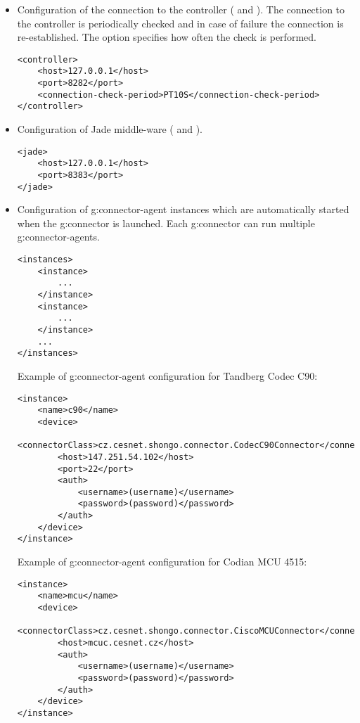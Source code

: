 \begin{itemize}
\item Configuration of the connection to the controller ( and ). The connection to the controller is periodically checked and in case of failure the connection is re-established. The option  specifies how often the check is performed.
\begin{verbatim}
<controller>
    <host>127.0.0.1</host>
    <port>8282</port>
    <connection-check-period>PT10S</connection-check-period>
</controller>
\end{verbatim}

\item Configuration of Jade middle-ware ( and ).
\begin{verbatim}
<jade>
    <host>127.0.0.1</host>
    <port>8383</port>
</jade>
\end{verbatim}

\item Configuration of \gls{g:connector-agent} instances which are automatically started when the \gls{g:connector} is launched. Each \gls{g:connector} can run multiple \glspl{g:connector-agent}.
\begin{verbatim}
<instances>
    <instance>
        ...
    </instance>
    <instance>
        ...
    </instance>
    ...
</instances>
\end{verbatim}

Example of \gls{g:connector-agent} configuration for Tandberg Codec C90:
\small\begin{verbatim}
<instance>
    <name>c90</name>
    <device>
        <connectorClass>cz.cesnet.shongo.connector.CodecC90Connector</connectorClass>
        <host>147.251.54.102</host>
        <port>22</port>
        <auth>
            <username>(username)</username>
            <password>(password)</password>
        </auth>
    </device>
</instance>
\end{verbatim}\normalsize

Example of \gls{g:connector-agent} configuration for Codian MCU 4515:
\small\begin{verbatim}
<instance>
    <name>mcu</name>
    <device>
        <connectorClass>cz.cesnet.shongo.connector.CiscoMCUConnector</connectorClass>
        <host>mcuc.cesnet.cz</host>
        <auth>
            <username>(username)</username>
            <password>(password)</password>
        </auth>
    </device>
</instance>
\end{verbatim}\normalsize
\end{itemize}


